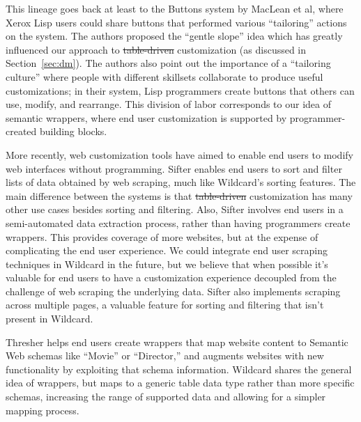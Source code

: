 \documentclass[sigplan,screen,10pt,anonymous,review]{acmart}
\providecommand{\DIFadd}[1]{{\protect\color{blue}\uwave{#1}}} %
\providecommand{\DIFdel}[1]{{\protect\color{red}\sout{#1}}}                      %
\providecommand{\DIFaddbegin}{} %
\providecommand{\DIFaddend}{} %
\providecommand{\DIFdelbegin}{} %
\providecommand{\DIFdelend}{} %
\begin{document}
This lineage goes back at least to the Buttons system by MacLean et
al\DIFaddbegin \DIFadd{.~}\DIFaddend \citep{maclean1990}, where Xerox Lisp users could share buttons that
performed various ``tailoring'' actions on the system. The authors
proposed the ``gentle slope'' idea which has greatly influenced our
approach to \DIFdelbegin \DIFdel{table-driven }\DIFdelend \DIFaddbegin \DIFadd{data-driven }\DIFaddend customization (as discussed in
Section~\ref{sec:dm}). The authors also point out the importance of a
``tailoring culture'' where people with different skillsets collaborate
to produce useful customizations; in their system, Lisp programmers
create buttons that others can use, modify, and rearrange. This division
of labor corresponds to our idea of semantic wrappers, where end user
customization is supported by programmer-created building blocks.

More recently, web customization tools have aimed to enable end users to
modify web interfaces without programming. Sifter \citep{huynh2006}
enables end users to sort and filter lists of data obtained by web
scraping, much like Wildcard's sorting features. The main difference
between the systems is that \DIFdelbegin \DIFdel{table-driven }\DIFdelend \DIFaddbegin \DIFadd{data-driven }\DIFaddend customization has many other use
cases besides sorting and filtering. Also, Sifter involves end users in
a semi-automated data extraction process, rather than having programmers
create wrappers. This provides coverage of more websites, but at the
expense of complicating the end user experience. We could integrate end
user scraping techniques in Wildcard in the future, but we believe that
when possible it's valuable for end users to have a customization
experience decoupled from the challenge of web scraping the underlying
data. Sifter also implements scraping across multiple pages, a valuable
feature for sorting and filtering that isn't present in Wildcard.

Thresher \citep{hogue2005} helps end users create wrappers that map
website content to Semantic Web schemas like ``Movie'' or ``Director,''
and augments websites with new functionality by exploiting that schema
information. Wildcard shares the general idea of wrappers, but maps to a
generic table data type rather than more specific schemas, increasing
the range of supported data and allowing for a simpler mapping process.
\end{document}
